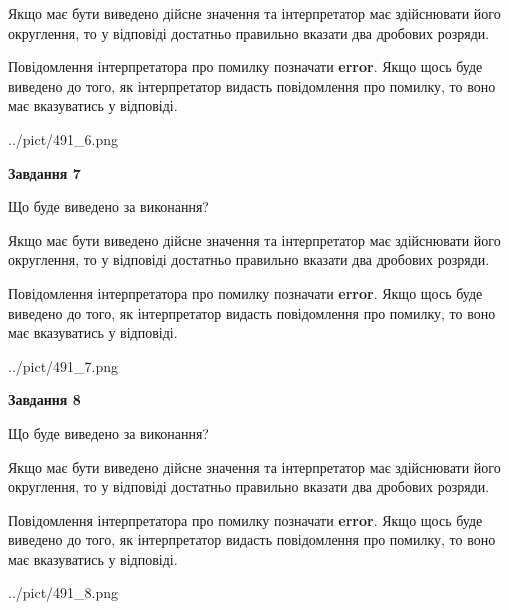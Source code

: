 \documentclass[12pt, ukrainian]{article}
\begin{document}
{\begin {Large}
Якщо має бути виведено дійсне значення та інтерпретатор має здійснювати його округлення, 
то у відповіді достатньо правильно вказати два дробових розряди.

Повідомлення інтерпретатора про помилку позначати \textbf{error}.
Якщо щось буде виведено до того, як інтерпретатор видасть повідомлення про помилку, 
то воно має вказуватись у відповіді. \par

\begin{center}
	{../pict/491_6.png}
\end{center}
\newpage

{\begin {center}\textbf{Завдання 7}\end {center}}\par
Що буде виведено за виконання? \par

Якщо має бути виведено дійсне значення та інтерпретатор має здійснювати його округлення, 
то у відповіді достатньо правильно вказати два дробових розряди.

Повідомлення інтерпретатора про помилку позначати \textbf{error}.
Якщо щось буде виведено до того, як інтерпретатор видасть повідомлення про помилку, 
то воно має вказуватись у відповіді. \par

\begin{center}
	{../pict/491_7.png}
\end{center}
\newpage

{\begin {center}\textbf{Завдання 8}\end {center}}\par
Що буде виведено за виконання? \par

Якщо має бути виведено дійсне значення та інтерпретатор має здійснювати його округлення, 
то у відповіді достатньо правильно вказати два дробових розряди.

Повідомлення інтерпретатора про помилку позначати \textbf{error}.
Якщо щось буде виведено до того, як інтерпретатор видасть повідомлення про помилку, 
то воно має вказуватись у відповіді. \par

\begin{center}
	{../pict/491_8.png}
\end{center}
\newpage


\end{Large}}
\end{document}
